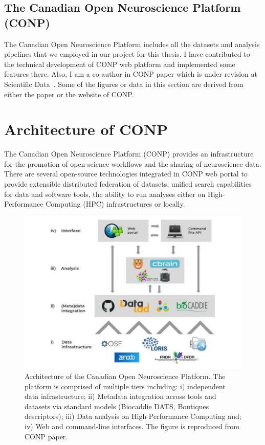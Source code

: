 \subsection{The Canadian Open Neuroscience Platform (CONP)}

The Canadian Open Neuroscience Platform includes all the datasets and analysis pipelines that we employed in our project for this thesis. I have contributed to the technical development of CONP web platform and implemented some features there. Also, I am a co-author in CONP paper which is under revision at Scientific Data~\cite{conp}. Some of the figures or data in this section are derived from either the paper or the website of CONP.


\section{Architecture of CONP}
The Canadian Open Neuroscience Platform (CONP) provides an infrastructure for the promotion of open-science workflows and the sharing of neuroscience data. There are several open-source technologies integrated in CONP web portal to provide extensible distributed federation of datasets, unified search capabilities for data and software tools, the ability to run analyses either on High-Performance Computing (HPC) infrastructures or locally.


\begin{figure}
    \centering
    \includegraphics[width=\textwidth]{figures/CONP_figure.pdf}
    \caption{Architecture of the Canadian Open Neuroscience Platform. The platform is comprised of multiple tiers including:  i) independent data infrastructure; ii) Metadata integration across tools and datasets via standard models (Biocaddie DATS, Boutiques descriptors); iii) Data analysis on High-Performance Computing and; iv) Web and command-line interfaces. The figure is reproduced from CONP paper.}
    \label{fig:CONP_figure}
\end{figure}

